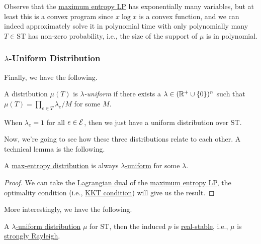 Observe that the \hyperref[eq:max-entropy]{maximum entropy LP} has exponentially many variables, but at least this is a convex program since \(x\log x\) is a convex function, and we can indeed approximately solve it in polynomial time with only polynomially many \(T\in \mathrm{ST} \) has non-zero probability, i.e., the size of the support of \(\mu\) is in polynomial.

\subsubsection{\(\lambda \)-Uniform Distribution}
Finally, we have the following.
\begin{definition}\label{def:lambda-uniform}
	A distribution \(\mu (T)\) is \emph{\(\lambda \)-uniform} if there exists a \(\lambda \in (\mathbb{\MakeUppercase{r}} ^+ \cup \left\{ 0 \right\} )^{n}\) such that \(\mu (T) = \prod_{e\in T} \lambda _e / M\) for some \(M\).
\end{definition}

\begin{note}
	When \(\lambda _e = 1\) for all \(e\in \mathcal{\MakeUppercase{e}} \), then we just have a uniform distribution over \(\mathrm{ST}\).
\end{note}

Now, we're going to see how these three distributions relate to each other. A technical lemma is the following.

\begin{proposition}\label{prop:lec13}
	A \hyperref[def:max-entropy-distribution]{max-entropy distribution} is always \hyperref[def:lambda-uniform]{\(\lambda \)-uniform} for some \(\lambda \).
\end{proposition}
\begin{proof}
	We can take the \href{https://en.wikipedia.org/wiki/Duality_(optimization)}{Lagrangian dual} of the \hyperref[eq:max-entropy]{maximum entropy LP}, the optimality condition (i.e., \href{https://en.wikipedia.org/wiki/Karush%E2%80%93Kuhn%E2%80%93Tucker_conditions}{KKT condition}) will give us the result.
\end{proof}

More interestingly, we have the following.

\begin{theorem}\label{thm:lec13}
	A \hyperref[def:lambda-uniform]{\(\lambda \)-uniform distribution} \(\mu \) for \(\mathrm{ST} \), then the induced \(p\) is \hyperref[def:real-stable]{real-stable}, i.e., \(\mu \) is \hyperref[def:strongly-Rayleigh-distribution]{strongly Rayleigh}.
\end{theorem}

